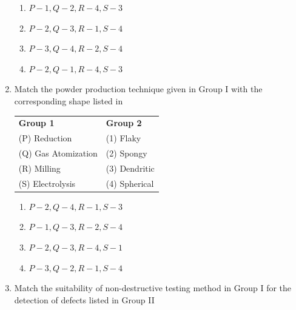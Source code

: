\documentclass[journal]{IEEEtran}
\theoremstyle{remark}
\begin{document}
\begin{enumerate}
\begin{multicols}{2}
\begin{enumerate}
    \item $P-1, Q-2, R-4, S-3 $
    \item  $P-2, Q-3, R-1, S-4$
    \item $P-3, Q-4, R-2, S-4$
    \item $P-2, Q-1, R-4, S-3 $
\end{enumerate}
\end{multicols}



\item Match the powder production technique given in Group I with the corresponding shape listed in \hfill{}\\
\begin{center}
\begin{tabular}{ll}
\textbf{Group 1 }& \textbf{Group 2}\\
 (P) Reduction     &  (1) Flaky \\
  (Q) Gas Atomization    & (2) Spongy \\
 (R) Milling & (3) Dendritic\\
 (S) Electrolysis & (4) Spherical\\
\end{tabular}
\end{center}
\begin{multicols}{2}
\begin{enumerate}
\item $P-2, Q-4, R-1, S-3$
\item  $P-1, Q-3, R-2, S-4$ 
\item $P-2, Q-3, R-4, S-1$
\item  $P-3, Q-2, R-1, S-4$
\end{enumerate}
\end{multicols}

\item Match the suitability of non-destructive testing method in Group I for the detection of defects listed in Group II \hfill{}\\
\begin{center}
    


\end{center}
\end{enumerate}
\end{document}
